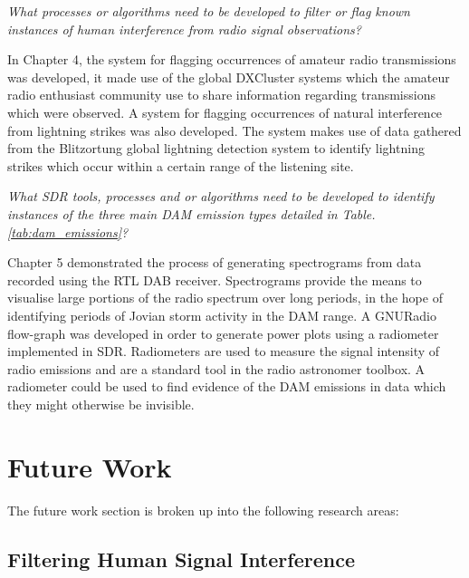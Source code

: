 \textit{What processes or algorithms need to be developed to filter or flag known instances of human interference from radio signal observations?}

In Chapter 4, the system for flagging occurrences of amateur radio transmissions was developed, it made use of the global DXCluster systems which the amateur radio enthusiast community use to share information regarding transmissions which were observed. A system for flagging occurrences of natural interference from lightning strikes was also developed. The system makes use of data gathered from the Blitzortung global lightning detection system to identify lightning strikes which occur within a certain range of the listening site.

\textit{What \gls{SDR} tools, processes and or algorithms need to be developed to identify instances of the three main \gls{DAM} emission types detailed in Table. \ref{tab:dam_emissions}?}

Chapter 5 demonstrated the process of generating spectrograms from data recorded using the RTL DAB receiver. Spectrograms provide the means to visualise large portions of the radio spectrum over long periods, in the hope of identifying periods of Jovian storm activity in the \gls{DAM} range. A GNURadio flow-graph was developed in order to generate power plots using a radiometer implemented in \gls{SDR}. Radiometers are used to measure the signal intensity of radio emissions and are a standard tool in the radio astronomer toolbox. A radiometer could be used to find evidence of the \gls{DAM} emissions in data which they might otherwise be invisible.

%
%
\section*{Future Work}

The future work section is broken up into the following research areas:

\subsection*{Filtering Human Signal Interference}

